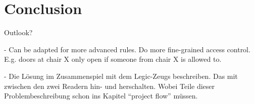 \section{Conclusion}\label{sec:conclusion}


Outlook?

- Can be adapted for more advanced rules. Do more fine-grained access control. E.g. doors at chair X only open if someone from chair X is allowed to.

- Die Lösung im Zusammenspiel mit dem Legic-Zeugs beschreiben. Das mit zwischen den zwei Readern hin- und herschalten.
Wobei Teile dieser Problembeschreibung schon ins Kapitel ``project flow'' müssen.